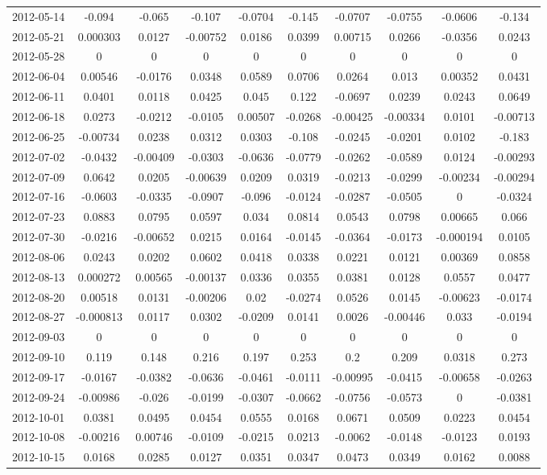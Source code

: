 \documentclass{article}
\DeclareMathOperator{\1}{\mathit{1}}
\numberwithin{figure}{section} %
\numberwithin{table}{section}
\begin{document}
\begin{table}[hbtp]
\begin{tabular}{cccccccccc}
2012-05-14 & -0.094 & -0.065 & -0.107 & -0.0704 & -0.145 & -0.0707 & -0.0755 & -0.0606 & -0.134\\
2012-05-21 & 0.000303 & 0.0127 & -0.00752 & 0.0186 & 0.0399 & 0.00715 & 0.0266 & -0.0356 & 0.0243\\
2012-05-28 & 0 & 0 & 0 & 0 & 0 & 0 & 0 & 0 & 0\\
2012-06-04 & 0.00546 & -0.0176 & 0.0348 & 0.0589 & 0.0706 & 0.0264 & 0.013 & 0.00352 & 0.0431\\
2012-06-11 & 0.0401 & 0.0118 & 0.0425 & 0.045 & 0.122 & -0.0697 & 0.0239 & 0.0243 & 0.0649\\
2012-06-18 & 0.0273 & -0.0212 & -0.0105 & 0.00507 & -0.0268 & -0.00425 & -0.00334 & 0.0101 & -0.00713\\
2012-06-25 & -0.00734 & 0.0238 & 0.0312 & 0.0303 & -0.108 & -0.0245 & -0.0201 & 0.0102 & -0.183\\
2012-07-02 & -0.0432 & -0.00409 & -0.0303 & -0.0636 & -0.0779 & -0.0262 & -0.0589 & 0.0124 & -0.00293\\
2012-07-09 & 0.0642 & 0.0205 & -0.00639 & 0.0209 & 0.0319 & -0.0213 & -0.0299 & -0.00234 & -0.00294\\
2012-07-16 & -0.0603 & -0.0335 & -0.0907 & -0.096 & -0.0124 & -0.0287 & -0.0505 & 0 & -0.0324\\
2012-07-23 & 0.0883 & 0.0795 & 0.0597 & 0.034 & 0.0814 & 0.0543 & 0.0798 & 0.00665 & 0.066\\
2012-07-30 & -0.0216 & -0.00652 & 0.0215 & 0.0164 & -0.0145 & -0.0364 & -0.0173 & -0.000194 & 0.0105\\
2012-08-06 & 0.0243 & 0.0202 & 0.0602 & 0.0418 & 0.0338 & 0.0221 & 0.0121 & 0.00369 & 0.0858\\
2012-08-13 & 0.000272 & 0.00565 & -0.00137 & 0.0336 & 0.0355 & 0.0381 & 0.0128 & 0.0557 & 0.0477\\
2012-08-20 & 0.00518 & 0.0131 & -0.00206 & 0.02 & -0.0274 & 0.0526 & 0.0145 & -0.00623 & -0.0174\\
2012-08-27 & -0.000813 & 0.0117 & 0.0302 & -0.0209 & 0.0141 & 0.0026 & -0.00446 & 0.033 & -0.0194\\
2012-09-03 & 0 & 0 & 0 & 0 & 0 & 0 & 0 & 0 & 0\\
2012-09-10 & 0.119 & 0.148 & 0.216 & 0.197 & 0.253 & 0.2 & 0.209 & 0.0318 & 0.273\\
2012-09-17 & -0.0167 & -0.0382 & -0.0636 & -0.0461 & -0.0111 & -0.00995 & -0.0415 & -0.00658 & -0.0263\\
2012-09-24 & -0.00986 & -0.026 & -0.0199 & -0.0307 & -0.0662 & -0.0756 & -0.0573 & 0 & -0.0381\\
2012-10-01 & 0.0381 & 0.0495 & 0.0454 & 0.0555 & 0.0168 & 0.0671 & 0.0509 & 0.0223 & 0.0454\\
2012-10-08 & -0.00216 & 0.00746 & -0.0109 & -0.0215 & 0.0213 & -0.0062 & -0.0148 & -0.0123 & 0.0193\\
2012-10-15 & 0.0168 & 0.0285 & 0.0127 & 0.0351 & 0.0347 & 0.0473 & 0.0349 & 0.0162 & 0.0088\\
    \hline\hline
    \end{tabular}
    \end{table}
    
\end{document}
